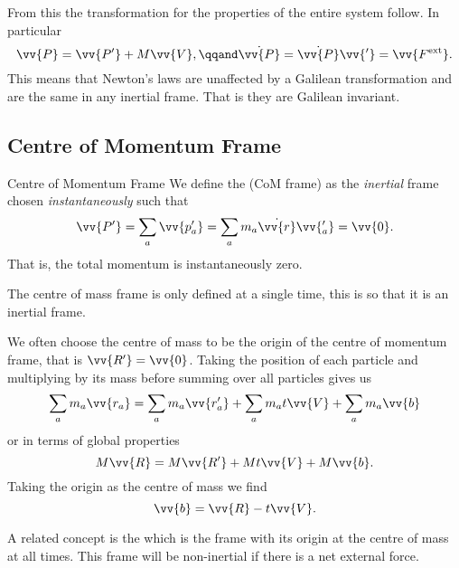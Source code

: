 \documentclass[fleqn]{NotesClass}
\newcommand*{\ext}{\mathrm{ext}}
\begin{document}
    From this the transformation for the properties of the entire system follow.
    In particular
    \begin{equation}
        \vv{P} = \vv{P'} + M\vv{V}, \qqand \dot{\vv{P}} = \dot{\vv{P}}\vv{'} = \vv{F^{\ext}}.
    \end{equation}
    This means that Newton's laws are unaffected by a Galilean transformation and are the same in any inertial frame.
    That is they are Galilean invariant.
    
    \subsection{Centre of Momentum Frame}
    \begin{dfn}{Centre of Momentum Frame}{}
        We define the  (CoM frame) as the \emph{inertial} frame chosen \emph{instantaneously} such that 
        \begin{equation}
            \vv{P'} = \sum_{a}\vv{p_a'} = \sum_{a} m_a\dot{\vv{r}}\vv{_a'} = \vv{0}.
        \end{equation}
        That is, the total momentum is instantaneously zero.
    \end{dfn}
    
    The centre of mass frame is only defined at a single time, this is so that it is an inertial frame.
    
    We often choose the centre of mass to be the origin of the centre of momentum frame, that is \(\vv{R'} = \vv{0}\).
    Taking the position of each particle and multiplying by its mass before summing over all particles gives us
    \begin{equation}
        \sum_a m_a\vv{r_a} = \sum_a m_a\vv{r_a'} + \sum_a m_at\vv{V} + \sum_a m_a\vv{b}
    \end{equation}
    or in terms of global properties
    \begin{equation}
        M\vv{R} = M\vv{R'} + Mt\vv{V} + M\vv{b}.
    \end{equation}
    Taking the origin as the centre of mass we find
    \begin{equation}
        \vv{b} = \vv{R} - t\vv{V}.
    \end{equation}
    
    A related concept is the  which is the frame with its origin at the centre of mass at all times.
    This frame will be non-inertial if there is a net external force.
    
\end{document}
